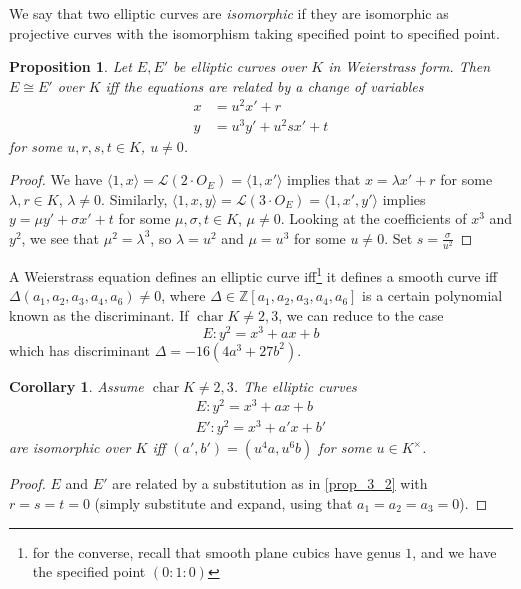 \documentclass[11pt]{article}
\theoremstyle{definition}
\theoremstyle{plain}
\newtheorem{proposition}[definition]{Proposition}
\newtheorem{corollary}[definition]{Corollary}
\theoremstyle{remark}
\DeclareMathOperator{\Char}{char}
\newcommand{\ZZ}{\mathbb{Z}}
\newcommand{\cL}{\mathcal{L}}
\begin{document}
We say that two elliptic curves are \emph{isomorphic} if they are isomorphic as projective curves with the isomorphism taking specified point to specified point.

\begin{proposition}\label{prop_3_2}
    Let $E, E'$ be elliptic curves over $K$ in Weierstrass form. Then $E \cong E'$ over $K$ iff the equations are related by a change of variables
    \begin{align*}
        x &= u^2 x' + r\\
        y &= u^3 y' + u^2 s x' + t
    \end{align*}
    for some $u,r,s,t \in K$, $u \neq 0$.
\end{proposition}
\begin{proof}
    We have $\langle 1,x \rangle = \cL(2 \cdot O_E) = \langle 1, x' \rangle$ implies that $x = \lambda x' + r$ for some $\lambda, r \in K$, $\lambda \neq 0$. Similarly, $\langle 1,x,y \rangle = \cL(3 \cdot O_E) = \langle 1,x',y' \rangle$ implies $y = \mu y' + \sigma x' + t$ for some $\mu, \sigma, t \in K$, $\mu \neq 0$. Looking at the coefficients of $x^3$ and $y^2$, we see that $\mu^2 = \lambda^3$, so $\lambda = u^2$ and $\mu = u^3$ for some $u \neq 0$. Set $s = \frac{\sigma}{u^2}$
\end{proof}

A Weierstrass equation defines an elliptic curve iff\footnote{for the converse, recall that smooth plane cubics have genus $1$, and we have the specified point $(0:1:0)$} it defines a smooth curve iff $\Delta(a_1, a_2, a_3, a_4, a_6) \neq 0$, where $\Delta \in \ZZ[a_1, a_2, a_3, a_4, a_6]$ is a certain polynomial known as the discriminant. If $\Char K \neq 2, 3$, we can reduce to the case
\begin{equation*}
    E : y^2 = x^3 + a x + b
\end{equation*}
which has discriminant $\Delta = -16(4a^3 + 27b^2)$.

\begin{corollary}
    Assume $\Char K \neq 2, 3$. The elliptic curves
    \begin{gather*}
        E : y^2 = x^3 + ax + b\\
        E' : y^2 = x^3 + a'x + b'
    \end{gather*}
    are isomorphic over $K$ iff $(a',b') = (u^4 a, u^6 b)$ for some $u \in K^\times$.
\end{corollary}
\begin{proof}
    $E$ and $E'$ are related by a substitution as in \autoref{prop_3_2} with $r = s = t = 0$ (simply substitute and expand, using that $a_1 = a_2 = a_3 = 0$).
\end{proof}
\end{document}
